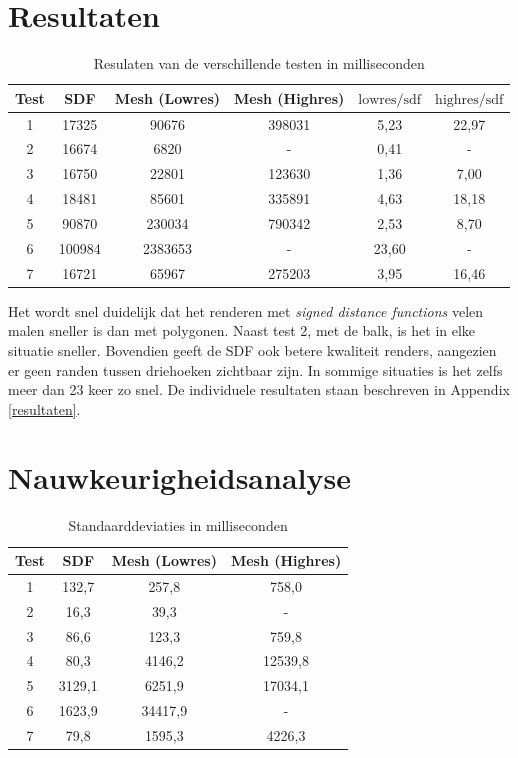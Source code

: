 \documentclass[12pt, a4paper]{article}
\begin{document}
\section{Resultaten}

\begin{table}[H]
\centering
\begin{tabular}{| c | c c c || c c |}
	\hline
	Test & SDF & Mesh (Lowres) & Mesh (Highres) & $\text{lowres}/\text{sdf}$ & $\text{highres}/\text{sdf}$ \\
	\hline
	1 & 17325 & 90676 & 398031 & 5,23 & 22,97 \\
	2 & 16674 & 6820 & - & 0,41 & - \\
	3 & 16750 & 22801 & 123630 & 1,36 & 7,00 \\
	4 & 18481 & 85601 & 335891 & 4,63 & 18,18 \\
	5 & 90870 & 230034 & 790342 & 2,53 & 8,70 \\
	6 & 100984 & 2383653 & - & 23,60 & - \\
	7 & 16721 & 65967 & 275203 & 3,95 & 16,46 \\
	\hline
\end{tabular}
\caption{Resulaten van de verschillende testen in milliseconden}
\end{table}

Het wordt snel duidelijk dat het renderen met \textit{signed distance functions} velen malen sneller is dan met polygonen. Naast test 2, met de balk, is het in elke situatie sneller. Bovendien geeft de SDF ook betere kwaliteit renders, aangezien er geen randen tussen driehoeken zichtbaar zijn. In sommige situaties is het zelfs meer dan 23 keer zo snel. De individuele resultaten staan beschreven in Appendix \ref{resultaten}.
\section{Nauwkeurigheidsanalyse}
\begin{table}[H]
	\centering
	\begin{tabular}{| c | c c c |}
		\hline
		Test & SDF & Mesh (Lowres) & Mesh (Highres) \\
		\hline
		1 & 132,7 & 257,8 & 758,0\\
		2 & 16,3 & 39,3 & - \\
		3 & 86,6 & 123,3 & 759,8  \\
		4 & 80,3 & 4146,2 & 12539,8 \\
		5 & 3129,1 & 6251,9 & 17034,1 \\
		6 & 1623,9 & 34417,9 & - \\
		7 & 79,8 & 1595,3 & 4226,3 \\
		\hline
	\end{tabular}
	\caption{Standaarddeviaties in milliseconden}
\end{table}
\end{document}
